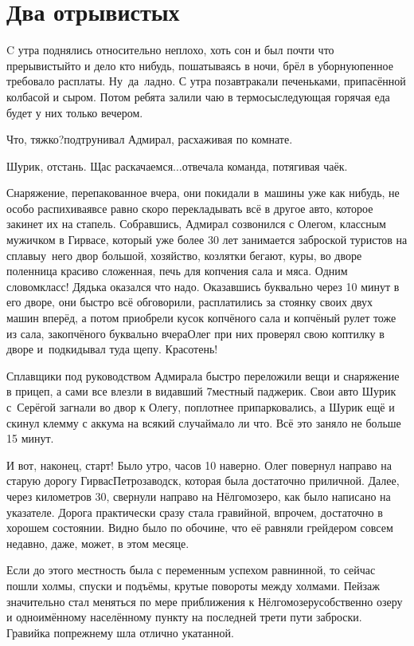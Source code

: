 \chapter{Два отрывистых}
\vepsianrose

C утра поднялись относительно неплохо, хоть сон и был почти что прерывистый\mdash то и дело кто нибудь, пошатываясь в ночи, брёл в уборную\mdash пенное требовало расплаты. Ну~да~ладно. С утра позавтракали печеньками, припасённой колбасой и сыром. Потом ребята залили чаю в термосы\mdash следующая горячая еда будет у них только вечером. 

\diagdash Что, тяжко?\mdash подтрунивал Адмирал, расхаживая по комнате.

\diagdash Шурик, отстань. Щас раскачаемся$\ldots$\mdash отвечала команда, потягивая чаёк.

Снаряжение, перепакованное вчера, они покидали в~машины уже как нибудь, не особо распихивая\mdash все равно скоро перекладывать всё в другое авто, которое закинет их на стапель. Собравшись, Адмирал созвонился с Олегом, классным мужичком в Гирвасе, который уже более 30 лет занимается заброской туристов на сплавы\mdash у~него двор большой, хозяйство, козлятки бегают, куры, во дворе поленница красиво сложенная, печь для копчения сала и мяса. Одним словом\mdash класс! Дядька оказался что надо. Оказавшись буквально через 10 минут в его дворе, они быстро всё обговорили, расплатились за стоянку своих двух машин вперёд, а потом приобрели кусок копчёного сала и копчёный рулет тоже из сала, закопчёного буквально вчера\mdash Олег при них проверял свою коптилку в дворе и~подкидывал туда щепу. Кра\sdash со\sdash тень! 

Сплавщики под руководством Адмирала быстро переложили вещи и снаряжение в прицеп, а сами все влезли в видавший 7\sdash местный паджерик. Свои авто Шурик с~Серёгой загнали во двор к Олегу, поплотнее припарковались, а Шурик ещё и скинул клемму с аккума на всякий случай\mdash мало ли что. Всё это заняло не больше 15 минут.

И вот, наконец, старт! Было утро, часов 10 наверно. Олег повернул направо на старую дорогу Гирвас\mdash Петрозаводск, которая была достаточно приличной. Далее, через километров 30, свернули направо на Нёлгомозеро, как было написано на указателе. Дорога практически сразу стала гравийной, впрочем, достаточно в хорошем состоянии. Видно было по обочине, что её равняли грейдером совсем недавно, даже, может, в этом месяце.

Если до этого местность была с переменным успехом равнинной, то сейчас пошли холмы, спуски и подъёмы, крутые повороты между холмами. Пейзаж значительно стал меняться по мере приближения к Нёлгомозеру\mdash собственно озеру и одноимённому населённому пункту на последней трети пути заброски. Гравийка по\sdash прежнему шла отлично укатанной.

